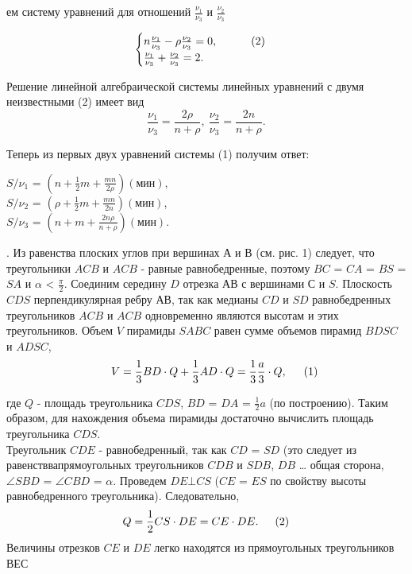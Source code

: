\begin{multicols}{2}
\begin{flushleft} ем систему уравнений для отношений $\frac{\nu_1}{\nu_3}$ и $\frac{\nu_2}{\nu_3}$ \end{flushleft}
\begin{equation*}
 \begin{cases}
   n \frac{\nu_1}{\nu_3} - \rho \frac{\nu_2}{\nu_3} = 0, \indent \indent (2) \\
   \frac{\nu_1}{\nu_3} + \frac{\nu_2}{\nu_3} = 2.
 \end{cases}
\end{equation*}


\indent Решение линейной алгебраической системы линейных уравнений с двумя неизвестными (2) имеет вид
\begin{equation*}
\frac{\nu_1}{\nu_3} = \frac{2\rho}{n + \rho},~
\frac{\nu_2}{\nu_3} = \frac{2n}{n + \rho}.
\end{equation*}

Теперь из первых двух уравнений системы (1) получим ответ:

\begin{center}
    $S/\nu_1$ = $(n + \frac{1}{2}m + \frac{mn}{2\rho})(\textit{мин})$, \\ \vspace{0.15cm}
    $S/\nu_2$ = $(\rho + \frac{1}{2}m + \frac{mn}{2n})(\textit{мин})$, \\ \vspace{0.15cm}
    $S/\nu_3$ = $(n + m + \frac{2n\rho}{n +\rho})(\textit{мин})$.\\
\end{center}

. Из равенства плоских углов при вершинах А и В (см. рис. 1) следует,
что треугольники $ACB$ и $ACB$ - равные равнобедренные, поэтому $BC$ = $CA$ = $BS$ = $SA$
и $\alpha$ < $\frac{\pi}{2}$. Соединим середину $D$ отрезка $АВ$ с вершинами $С$ и $S$.
Плоскость $CDS$ перпендикулярная ребру $АВ$, так как медианы $CD$ и $SD$ равнобедренных треугольников
$ACB$ и $ACB$ одновременно являются высотам и этих треугольников. Объем $V$ пирамиды $SABC$ равен
сумме объемов пирамид $BDSC$ и $ADSC$,\\
\begin{equation*}
\indent V = \frac{1}{3} BD \cdot Q + \frac{1}{3} AD \cdot Q = \frac{1}{3} \frac{a}{3} \cdot Q, \indent (1)\\
\end{equation*}

где $Q$ - площадь треугольника $CDS$,
$BD$ = $DA$ = $\frac{1}{2}a$ (по построению). Таким образом, для нахождения объема пирамиды
достаточно вычислить площадь треугольника $CDS$.\\
\indent Треугольник $CDE$ - равнобедренный, так как $CD$ = $SD$ (это следует из равенстввапрямоугольных
треугольников $CDB$ и $SDB$, $DB$ … общая сторона, $\angle SBD$ = $\angle CBD$ = $\alpha$.
Проведем $DE \bot CS$ ($CE$ = $ES$ по свойству высоты равнобедренного треугольника). Следовательно,
\begin{equation*}
    Q = \frac{1}{2} CS \cdot DE = CE \cdot DE . \indent (2)
\end{equation*}
Величины отрезков $CE$ и $DE$ легко находятся из прямоугольных треугольников $ВЕС$



\end{multicols}
